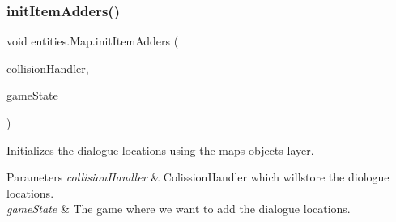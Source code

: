 \subsubsection{\texorpdfstring{init\+Item\+Adders()}{initItemAdders()}}
{\footnotesize\ttfamily void entities.\+Map.\+init\+Item\+Adders (\begin{DoxyParamCaption}\item[{\mbox{\hyperlink{classentities_1_1_collision_handler}{Collision\+Handler}}}]{collision\+Handler,  }\item[{\mbox{\hyperlink{classstates_1_1_game_state}{Game\+State}}}]{game\+State }\end{DoxyParamCaption})\hspace{0.3cm}{\ttfamily [inline]}}

Initializes the dialogue locations using the map\textquotesingle{}s objects layer.


\begin{DoxyParams}{Parameters}
{\em collision\+Handler} & Colission\+Handler which willstore the diologue locations. \\
\hline
{\em game\+State} & The game where we want to add the dialogue locations. \\
\hline
\end{DoxyParams}

